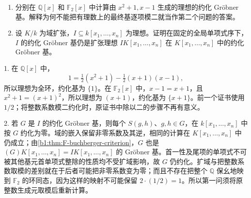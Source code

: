 \begin{exercise}\label{b1:ex:F-coefficient-specialization}
	\begin{enumerate}
		\item 分别在 \(\mathbb Q[x]\) 和 \(\mathbb F_2[x]\) 中计算由 \(x^2+1,x-1\) 生成的理想的约化 Gröbner 基。解释为何不能把有理数上的最终基逐项模二就当作第二个问题的答案。
		\item 设 \(K/k\) 为域扩张，\(I\subseteq k[x_1,\ldots,x_n]\) 为理想。证明在固定的全局单项式序下，\(I\) 的约化 Gröbner 基仍是扩张理想 \(I K[x_1,\ldots,x_n]\) 在 \(K[x_1,\ldots,x_n]\) 中的约化 Gröbner 基。
	\end{enumerate}
\end{exercise}
\begin{solution}
	1. 在 \(\mathbb Q[x]\) 中，
	\[
		1=\tfrac12(x^2+1)-\tfrac12(x+1)(x-1),
	\]
	所以理想为全环，约化基为 \(\{1\}\)。在 \(\mathbb F_2[x]\) 中，\(x-1=x+1\)，且 \(x^2+1=(x+1)^2\)，所以理想为 \((x+1)\)，约化基为 \(\{x+1\}\)。前一个证书使用 \(1/2\)；将整数系数模二约化时，原证书中除以二的步骤不再有意义。

	2. 若 \(G\) 是 \(I\) 的约化 Gröbner 基，则每个 \(S(g,h)\)、\(g,h\in G\)，在 \(k[x_1,\ldots,x_n]\) 中按 \(G\) 约化为零。域的嵌入保留非零系数及其逆，相同的计算在 \(K[x_1,\ldots,x_n]\) 中仍成立；由\cref{b1:thm:F-buchberger-criterion}，\(G\) 也是 \((G)K[x_1,\ldots,x_n]=I K[x_1,\ldots,x_n]\) 的 Gröbner 基。首一性及尾项的单项式不可被其他基元首单项式整除的性质均不受扩域影响，故 \(G\) 仍约化。扩域与把整数系数取模的差别就在于后者可能把非零系数变为零；而且不存在把整个 \(\mathbb Q\) 保幺地映到 \(\mathbb F_2\) 的环同态，因为这样的映射不可能保留 \(2\cdot(1/2)=1\)。所以第一问须将原整数生成元取模后重新计算。
\end{solution}

